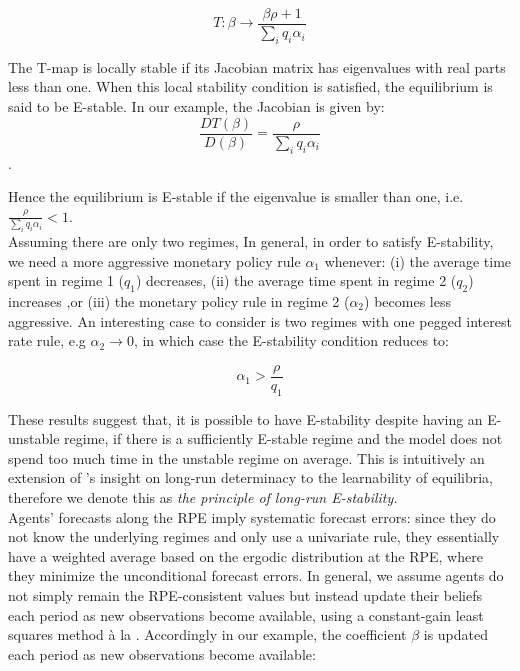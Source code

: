 \documentclass[12pt,reqno]{article}
\numberwithin{equation}{section}
\begin{document}
$$ T: \beta \rightarrow \frac{\beta \rho + 1 }{\sum_i q_i \alpha_i} $$

The T-map is locally stable if its Jacobian matrix has eigenvalues with real parts less than one. When this local stability condition is satisfied, the equilibrium is said to be E-stable. In our example, the Jacobian is given by: \\

$$ \frac{DT(\beta)}{D(\beta)} = \frac{\rho}{\sum_i q_i \alpha_i} $$. 

Hence the equilibrium is E-stable if the eigenvalue is smaller than one, i.e. $\frac{\rho}{\sum_i q_i \alpha_i} < 1 $. \\

Assuming there are only two regimes, In general, in order to satisfy E-stability, we need a more aggressive monetary policy rule $\alpha_1 $ whenever: (i) the average time spent in regime 1 ($q_1 $) decreases, (ii) the average time spent in regime 2 ($q_2 $) increases ,or (iii) the monetary policy rule in regime 2 ($\alpha_2 $) becomes less aggressive. An interesting case to consider is two regimes with one pegged interest rate rule, e.g $\alpha_2 \rightarrow 0 $, in which case the E-stability condition reduces to: 

$$ \alpha_1 > \frac{\rho}{q_1} $$

These results suggest that, it is possible to have E-stability despite having an E-unstable regime, if there is a sufficiently E-stable regime and the model does not spend too much time in the unstable regime on average. This is intuitively an extension of \citeauthor{davig2007generalizing}’s insight on long-run determinacy to the learnability of equilibria, therefore we denote this as  \textit{the principle of long-run E-stability.} \\

\noindent
Agents' forecasts along the RPE imply systematic forecast errors: since they do not know the underlying regimes and only use a univariate rule, they essentially have a weighted average based on the ergodic distribution at the RPE, where they minimize the unconditional forecast errors. In general, we assume agents do not simply remain the RPE-consistent values but instead update their beliefs each period as new observations become available, using a constant-gain least squares method à la \cite{evans2012learning} . Accordingly in our example, the coefficient $\beta$ is updated each period as new observations become available: \\
\end{document}

